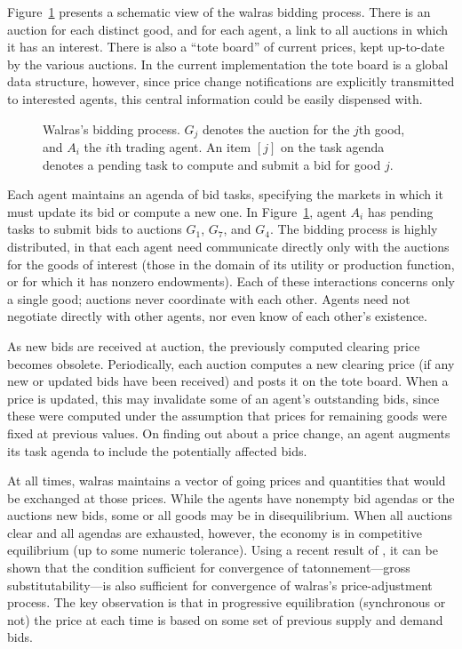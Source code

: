 Figure~\ref{fig:protocol} presents a schematic view of the {\sc walras} 
bidding process.
There is an auction for each distinct good, and for each agent, a 
link to all auctions in which it has an interest.
There is also a ``tote board'' of current prices, kept up-to-date by the 
various auctions.  In the current implementation the 
tote board is a global data structure, however, since price change notifications 
are explicitly transmitted to interested agents, this central 
information could be easily dispensed with.

\begin{figure}[htbp]
\centerline{}
\caption{{\sc Walras}'s bidding process.  $G_j$ denotes the auction for 
the $j$th good, and $A_i$ the $i$th trading agent.  An item $[j]$ on the 
task agenda denotes a pending task to compute and submit a bid for good 
$j$.}
\label{fig:protocol}
\end{figure}

Each agent maintains an agenda of bid tasks, specifying the
markets in which it must update its bid or compute a new one. 
In Figure~\ref{fig:protocol}, agent $A_i$ has pending tasks 
to submit bids to auctions $G_1$, $G_7$, and $G_4$.
The bidding process is highly distributed, in that each agent need
communicate directly only with the auctions for the goods of interest
(those in the domain of its utility or production function, or for which it
has nonzero endowments).  Each of these interactions concerns only a single
good; auctions never coordinate with each other.  Agents need not negotiate
directly with other agents, nor even know of each other's existence.

As new bids are received at auction, the previously computed clearing price
becomes obsolete. Periodically, each auction computes a new clearing price
(if any new or updated bids have been received) and posts it on the tote 
board.
When a price is updated, this may
invalidate some of an agent's outstanding bids, since these were computed
under the assumption that prices for remaining goods were fixed at 
previous values.
On finding out about a price change, an agent augments its task agenda to 
include the potentially affected bids.

At all times, {\sc walras} maintains a vector of going prices
and quantities that would be exchanged at those prices.  While the agents
have nonempty bid agendas or the auctions new bids, some or all goods may
be in disequilibrium.  When all auctions clear and all agendas are exhausted,
however, the economy is in competitive equilibrium (up to some numeric
tolerance). 
Using a recent result of , it
can be shown that the condition sufficient for convergence of 
tatonnement---gross substitutability---is also sufficient for convergence 
of {\sc walras}'s price-adjustment process.
The key observation is that in progressive equilibration (synchronous or
not) the price at each time is based on some set of previous supply
and demand bids.

